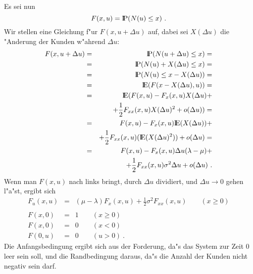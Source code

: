 \begin{enumerate}
Es sei nun 
\[F(x,u) = {\rm I\kern-0.2em P}(N(u) \leq x) ~.\]
Wir stellen eine Gleichung f"ur $F(x,u+\Delta u)$ auf, dabei sei $X(\Delta u)$ die "Anderung der Kunden w"ahrend $\Delta u$: 
\begin{eqnarray*}
F(x,u+\Delta u)&=&{\rm I\kern-0.2em P}(N(u+\Delta u) \leq x) = \\
               &=&{\rm I\kern-0.2em P}(N(u)+X(\Delta u) \leq x) = \\
               &=&{\rm I\kern-0.2em P}(N(u) \leq x - X(\Delta u)) = \\
               &=&{\rm I\kern-0.2em E}(F(x-X(\Delta u),u)) = \\
               &=&{\rm I\kern-0.2em E}(F(x,u)-F_{x}(x,u)X(\Delta u) + \\
               & &+ \frac{1}{2}F_{xx}(x,u)X(\Delta u)^{2} + o(\Delta u)) = \\
               &=&F(x,u)-F_{x}(x,u){\rm I\kern-0.2em E}(X(\Delta u)) + \\
               & &+\frac{1}{2}F_{xx}(x,u)({\rm I\kern-0.2em E}(X(\Delta u)^{2})) + o(\Delta u) = \\
               &=&F(x,u)-F_{x}(x,u)\Delta u(\lambda-\mu) + \\
               & &+\frac{1}{2}F_{xx}(x,u)\sigma^{2}\Delta u + o(\Delta u) ~.
\end{eqnarray*}
Wenn man $F(x,u)$ nach links bringt, durch $\Delta u$ dividiert, und $\Delta u \rightarrow 0$ gehen l"a"st, ergibt sich
\begin{eqnarray*}
F_{u}(x,u)&=&(\mu - \lambda)F_{x}(x,u) + \frac{1}{2}\sigma^{2}F_{xx}(x,u) \qquad (x \geq 0) \\
      & & \\
F(x,0)&=&1 \qquad (x \geq 0) \\
F(x,0)&=&0 \qquad (x < 0) \\
F(0,u)&=&0 \qquad (u > 0) ~.
\end{eqnarray*}
Die Anfangsbedingung ergibt sich aus der Forderung, da"s das System zur Zeit $0$ leer sein soll, und die Randbedingung daraus, da"s die Anzahl der Kunden nicht
negativ sein darf.


\end{enumerate}
